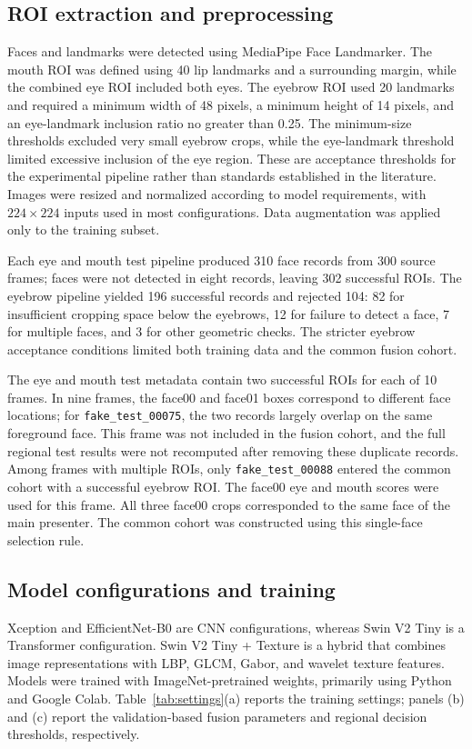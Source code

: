 \documentclass[a4paper]{elektr}
\begin{document}
\subsection{ROI extraction and preprocessing}
Faces and landmarks were detected using MediaPipe Face Landmarker. The mouth ROI was defined using 40 lip landmarks and a surrounding margin, while the combined eye ROI included both eyes. The eyebrow ROI used 20 landmarks and required a minimum width of 48 pixels, a minimum height of 14 pixels, and an eye-landmark inclusion ratio no greater than 0.25. The minimum-size thresholds excluded very small eyebrow crops, while the eye-landmark threshold limited excessive inclusion of the eye region. These are acceptance thresholds for the experimental pipeline rather than standards established in the literature. Images were resized and normalized according to model requirements, with $224 \times 224$ inputs used in most configurations. Data augmentation was applied only to the training subset.

Each eye and mouth test pipeline produced 310 face records from 300 source frames; faces were not detected in eight records, leaving 302 successful ROIs. The eyebrow pipeline yielded 196 successful records and rejected 104: 82 for insufficient cropping space below the eyebrows, 12 for failure to detect a face, 7 for multiple faces, and 3 for other geometric checks. The stricter eyebrow acceptance conditions limited both training data and the common fusion cohort.

The eye and mouth test metadata contain two successful ROIs for each of 10 frames. In nine frames, the face00 and face01 boxes correspond to different face locations; for \texttt{fake\_test\_00075}, the two records largely overlap on the same foreground face. This frame was not included in the fusion cohort, and the full regional test results were not recomputed after removing these duplicate records. Among frames with multiple ROIs, only \texttt{fake\_test\_00088} entered the common cohort with a successful eyebrow ROI. The face00 eye and mouth scores were used for this frame. All three face00 crops corresponded to the same face of the main presenter. The common cohort was constructed using this single-face selection rule.

\subsection{Model configurations and training}
Xception and EfficientNet-B0 are CNN configurations, whereas Swin V2 Tiny is a Transformer configuration. Swin V2 Tiny + Texture is a hybrid that combines image representations with LBP, GLCM, Gabor, and wavelet texture features. Models were trained with ImageNet-pretrained weights, primarily using Python and Google Colab. Table~\ref{tab:settings}(a) reports the training settings; panels (b) and (c) report the validation-based fusion parameters and regional decision thresholds, respectively.
\end{document}
